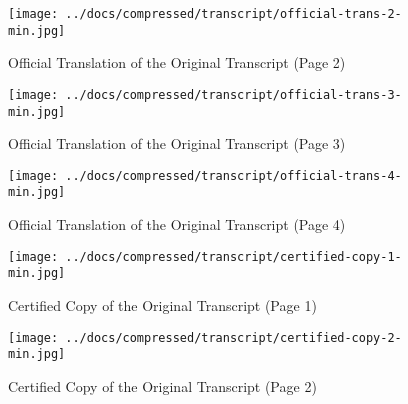 \vspace*{\fill}
\begin{figure}[H]
    \centering
    \texttt{[image: ../docs/compressed/transcript/official-trans-2-min.jpg]}
    \caption{Official Translation of the Original Transcript (Page 2)}
    \label{fig:official-trans-transcript-2}
\end{figure}
\vspace*{\fill}

\clearpage

\vspace*{\fill}
\begin{figure}[H]
    \centering
    \texttt{[image: ../docs/compressed/transcript/official-trans-3-min.jpg]}
    \caption{Official Translation of the Original Transcript (Page 3)}
    \label{fig:official-trans-transcript-3}
\end{figure}
\vspace*{\fill}

\clearpage

\vspace*{\fill}
\begin{figure}[H]
    \centering
    \texttt{[image: ../docs/compressed/transcript/official-trans-4-min.jpg]}
    \caption{Official Translation of the Original Transcript (Page 4)}
    \label{fig:official-trans-transcript-4}
\end{figure}
\vspace*{\fill}

\clearpage

\vspace*{\fill}
\begin{figure}[H]
    \centering
    \texttt{[image: ../docs/compressed/transcript/certified-copy-1-min.jpg]}
    \caption{Certified Copy of the Original Transcript (Page 1)}
    \label{fig:certified-copy-transcript-1}
\end{figure}
\vspace*{\fill}

\clearpage

\vspace*{\fill}
\begin{figure}[H]
    \centering
    \texttt{[image: ../docs/compressed/transcript/certified-copy-2-min.jpg]}
    \caption{Certified Copy of the Original Transcript (Page 2)}
    \label{fig:certified-copy-transcript-2}
\end{figure}
\vspace*{\fill}


